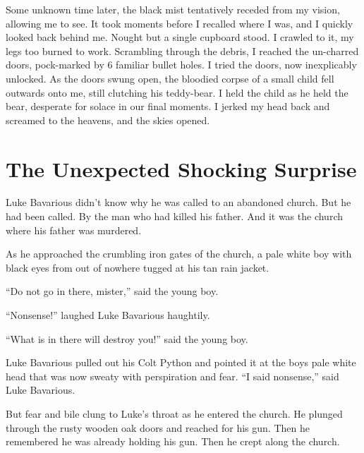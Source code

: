 Some unknown time later, the black mist tentatively receded from my
vision, allowing me to see. It took moments before I recalled where
I was, and I quickly looked back behind me. Nought but a single
cupboard stood. I crawled to it, my legs too burned to work.
Scrambling through the debris, I reached the un-charred doors,
pock-marked by 6 familiar bullet holes. I tried the doors, now
inexplicably unlocked. As the doors swung open, the bloodied corpse
of a small child fell outwards onto me, still clutching his
teddy-bear. I held the child as he held the bear, desperate for
solace in our final moments. I jerked my head back and screamed to
the heavens, and the skies opened. 
 



\chapter{The Unexpected Shocking Surprise}





Luke Bavarious didn't know why he was called to an abandoned
church. But he had been called. By the man who had killed his
father. And it was the church where his father was murdered.



As he approached the crumbling iron gates of the church, a pale
white boy with black eyes from out of nowhere tugged at his tan
rain jacket.



``Do not go in there, mister,'' said the young boy.



``Nonsense!'' laughed Luke Bavarious haughtily.



``What is in there will destroy you!'' said the young
boy.



Luke Bavarious pulled out his Colt Python and pointed it at the
boys pale white head that was now sweaty with perspiration and
fear. ``I said nonsense,'' said Luke Bavarious.



But fear and bile clung to Luke's throat as he entered the
church. He plunged through the rusty wooden oak doors and reached
for his gun. Then he remembered he was already holding his gun.
Then he crept along the church.



